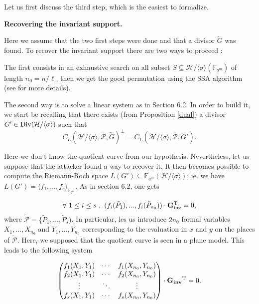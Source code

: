 \documentclass[10pt]{article}
\newcommand{\s}{\vspace{0.3cm}}
\newcommand{\cd}{\cdot}
\newcommand{\fqm}{\mathbb{F}_{q^m}}
\newcommand{\su}{\subseteq}
\newcommand{\PR}{\mathcal{P}}
\begin{document}
Let us first discuss the third step, which is the easiest to formalize.

\s

\bf{Recovering the invariant support.}
\s

\rm  Here we assume that the two first steps were done and that a divisor $\tilde{G}$ was found. To recover the invariant support there are two ways to proceed :

\s

The first consists in an exhaustive search on all subset $S \su \mathcal{H}/\langle \sigma \rangle\left(\fqm\right)$ of length $n_0=n/\ell$, then we get the good permutation using the SSA algorithm (see \cite{SSA} for more details).

\s

The second way is to solve a linear system as in Section 6.2. In order to build it, we start be recalling that there exists (from Proposition \ref{dual}) a divisor $G' \in \rm Div \it (\mathcal{H}/\langle \sigma \rangle)$ such that 
\[ C_L(\mathcal{H}/\langle \sigma \rangle,\tilde{\PR},\tilde{G})^{\perp} = C_L(\mathcal{H}/\langle \sigma \rangle,\tilde{\PR},G').\]

Here we don't know the quotient curve from our hypothesis. Nevertheless, let us suppose that the attacker found a way to recover it. It then becomes possible to compute the Riemann-Roch space $L(G') \su \fqm(\mathcal{H}/\langle \sigma \rangle)$;
ie. we have $L(G') = \langle f_1,...,f_s \rangle_{\fqm}$. As in section 6.2, one gets 

\begin{equation*}
\forall \ 1 \leq i \leq s \ , \ (f_i(\tilde{P}_1),...,f_i(\tilde{P}_{n_0})) \cd \bf{G}\rm ^T_{inv} = 0,
\end{equation*}
where $\tilde{\PR} = \{\tilde{P}_1,...,\tilde{P}_s)$. In particular, les us introduce $2n_0$ formal variables $X_1,...,X_{n_0}$ and $Y_1,...,Y_{n_0}$ corresponding to the evaluation in $x$ and $y$ on the places of $\tilde{\PR}$. Here, we supposed that the quotient curve is seen in a plane model. This leads to the following system

\begin{equation*}
\begin{pmatrix}
f_1(X_1,Y_1) & \cdots & f_1(X_{n_0},Y_{n_0}) \\
f_2(X_1,Y_1) & \cdots & f_2(X_{n_0},Y_{n_0}) \\
\vdots & \ddots & \vdots \\
f_s(X_1,Y_1) & \cdots & f_s(X_{n_0},Y_{n_0}) \\
\end{pmatrix}
\cd \bf{G_{inv}} \rm{^T} = 0.
\end{equation*}
\end{document}
